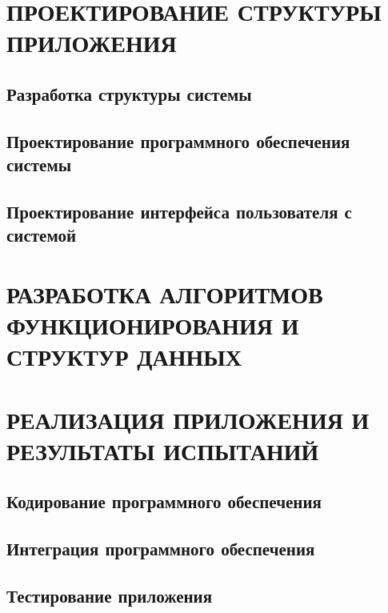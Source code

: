 \documentclass[12pt, a4paper, simple]{eskdtext}
\begin{document}
    \newpage
    
    \section{ПРОЕКТИРОВАНИЕ СТРУКТУРЫ ПРИЛОЖЕНИЯ}
    
    \subsection{Разработка структуры системы}

    \newpage

    \subsection{Проектирование программного обеспечения системы}

    \newpage

    \subsection{Проектирование интерфейса пользователя с системой}
    
    \newpage

    \section{РАЗРАБОТКА АЛГОРИТМОВ ФУНКЦИОНИРОВАНИЯ И СТРУКТУР ДАННЫХ}

    \newpage
    
    \section{РЕАЛИЗАЦИЯ ПРИЛОЖЕНИЯ И РЕЗУЛЬТАТЫ ИСПЫТАНИЙ}
    \subsection{Кодирование программного обеспечения}

    \newpage
    
    \subsection{Интеграция программного обеспечения}

    \newpage

    \subsection{Тестирование приложения}
\end{document}
